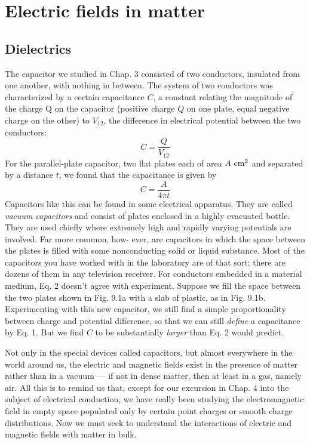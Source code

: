 \chapter{Electric fields in matter}

\section{Dielectrics}

The capacitor we studied in Chap. 3 consisted of two conductors,
insulated from one another, with nothing in between. The system
of two conductors was characterized by a certain capacitance $C$, a
constant relating the magnitude of the charge Q on the capacitor
(positive charge $Q$ on one plate, equal negative charge on the other)
to $V_{12}$, the difference in electrical potential between the two 
conductors:
\begin{equation}
  C = \frac{Q}{V_{12}}
\end{equation}
For the parallel-plate capacitor, two flat plates each of area $A\ \textup{cm}^2$
and separated by a distance $t$, we found that the capacitance is
given by
\begin{equation}
  C = \frac{A}{4\pi t}
\end{equation}
Capacitors like this can be found in some electrical apparatus. They
are called \emph{vacuum capacitors}
and consist of plates enclosed in a highly
evacuated bottle. They are used chiefly where extremely high and
rapidly varying potentials are involved. Far more common, how-
ever, are capacitors in which the space between the plates is filled
with some nonconducting solid or liquid substance. Most of the
capacitors you have worked with in the laboratory are of that sort;
there are dozens of them in any television receiver. For conductors
embedded in a material medium, Eq. 2 doesn't agree with experiment.
Suppose we fill the space between the two plates shown in Fig. 9.1a
with a slab of plastic, as in Fig. 9.1b. Experimenting with this new
capacitor, we still find a simple proportionality between charge and
potential difierence, so that we can still \emph{define} a capacitance by Eq. 1.
But we find $C$ to be substantially \emph{larger} than Eq. 2 would 
predict.

Not only in the special devices called capacitors, but almost everywhere
in the world around us, the electric and magnetic fields exist
in the presence of matter rather than in a vacuum --- if not in dense
matter, then at least in a gas, namely air. All this is to remind us
that, except for our excursion in Chap. 4 into the subject of electrical
conduction, we have really been studying the electromagnetic field
in empty space populated only by certain point charges or smooth
charge distributions. Now we must seek to understand the interactions
of electric and magnetic fields with matter in bulk.

